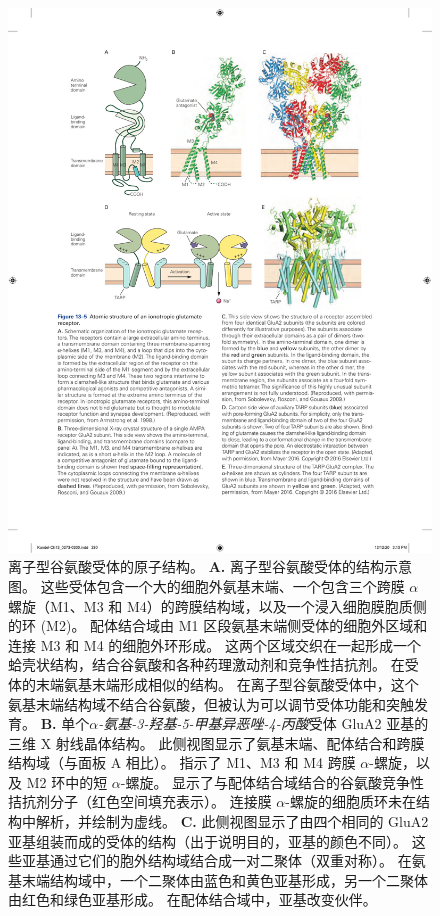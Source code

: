 \begin{figure}[htbp]
	\centering
	\includegraphics[width=0.8\linewidth]{chap13/fig_13_5}
	\caption{离子型谷氨酸受体的原子结构。
		\textbf{A.} 离子型谷氨酸受体的结构示意图。 
		这些受体包含一个大的细胞外氨基末端、一个包含三个跨膜 $\alpha$螺旋（M1、M3 和 M4）的跨膜结构域，以及一个浸入细胞膜胞质侧的环 (M2)。
		配体结合域由 M1 区段氨基末端侧受体的细胞外区域和连接 M3 和 M4 的细胞外环形成。
		这两个区域交织在一起形成一个蛤壳状结构，结合谷氨酸和各种药理激动剂和竞争性拮抗剂。
		在受体的末端氨基末端形成相似的结构。
		在离子型谷氨酸受体中，这个氨基末端结构域不结合谷氨酸，但被认为可以调节受体功能和突触发育\cite{armstrong1998structure}。
		\textbf{B.} 单个\textit{$\alpha$-氨基-3-羟基-5-甲基异恶唑-4-丙酸}受体 GluA2 亚基的三维 X 射线晶体结构。
		此侧视图显示了氨基末端、配体结合和跨膜结构域（与面板 A 相比）。
		指示了 M1、M3 和 M4 跨膜 $\alpha$-螺旋，以及 M2 环中的短 $\alpha$-螺旋。
		显示了与配体结合域结合的谷氨酸竞争性拮抗剂分子（红色空间填充表示）。
		连接膜 $\alpha$-螺旋的细胞质环未在结构中解析，并绘制为虚线\cite{sobolevsky2009x}。
		\textbf{C.} 此侧视图显示了由四个相同的 GluA2 亚基组装而成的受体的结构（出于说明目的，亚基的颜色不同）。
		这些亚基通过它们的胞外结构域结合成一对二聚体（双重对称）。
		在氨基末端结构域中，一个二聚体由蓝色和黄色亚基形成，另一个二聚体由红色和绿色亚基形成。
		在配体结合域中，亚基改变伙伴。
}
\end{figure}

